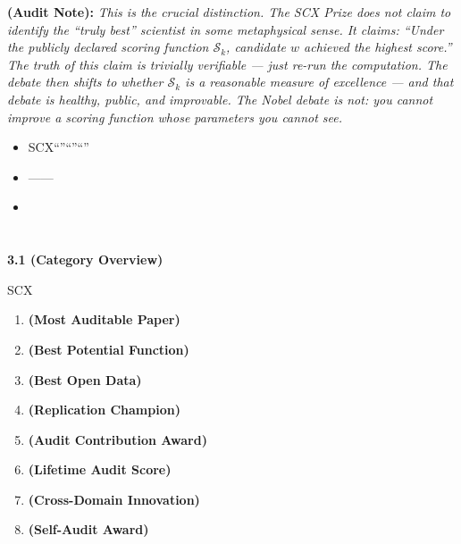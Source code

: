 \documentclass[12pt,a4paper]{article}
\theoremstyle{remark}
\newcommand{\scoreOp}{\mathcal{S}}
\newenvironment{honestbox}{%
    \medskip\noindent
    \color{red}
    \begin{minipage}{0.92\textwidth}
    \textbf{}
    \begin{itemize}[leftmargin=*]
}{%
    \end{itemize}
    \end{minipage}
    \medskip
}
\newcommand{\auditnote}[1]{%
    \medskip\noindent
    \textbf{ (Audit Note):} \textit{#1}%
}
\begin{document}
\auditnote{This is the crucial distinction. The SCX Prize does not claim to identify the ``truly best'' scientist in some metaphysical sense. It claims: ``Under the publicly declared scoring function $\scoreOp_k$, candidate $w$ achieved the highest score.'' The truth of this claim is trivially verifiable — just re-run the computation. The debate then shifts to whether $\scoreOp_k$ is a reasonable measure of excellence — and \textit{that} debate is healthy, public, and improvable. The Nobel debate is not: you cannot improve a scoring function whose parameters you cannot see.}

\begin{honestbox}
    \item SCX``''\textbf{}``''``''
    \item ——
    \item 
\end{honestbox}

\newpage

\section{}
\label{sec:categories}

\subsection{}

\noindent
\textbf{3.1  (Category Overview)}

SCX\textbf{}

\begin{enumerate}[label=\textbf{C\arabic*}., leftmargin=*]
    \item \textbf{ (Most Auditable Paper)}
    \item \textbf{ (Best Potential Function)}
    \item \textbf{ (Best Open Data)}
    \item \textbf{ (Replication Champion)}
    \item \textbf{ (Audit Contribution Award)}
    \item \textbf{ (Lifetime Audit Score)}
    \item \textbf{ (Cross-Domain Innovation)}
    \item \textbf{ (Self-Audit Award)}
\end{enumerate}
\end{document}
